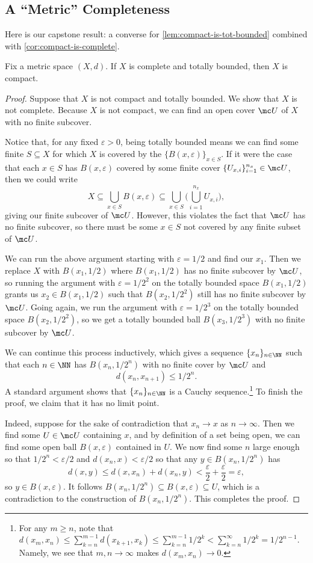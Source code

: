 \documentclass[../notes.tex]{subfiles}
\begin{document}
\subsection{A ``Metric'' Completeness}
Here is our capstone result: a converse for \autoref{lem:compact-is-tot-bounded} combined with \autoref{cor:compact-is-complete}.
\begin{theorem} \label{thm:metric-compact}
	Fix a metric space $(X,d)$. If $X$ is complete and totally bounded, then $X$ is compact.
\end{theorem}
\begin{proof}
	Suppose that $X$ is not compact and totally bounded. We show that $X$ is not complete. Because $X$ is not compact, we can find an open cover $\mc U$ of $X$ with no finite subcover.
	
	Notice that, for any fixed $\varepsilon>0$, being totally bounded means we can find some finite $S\subseteq X$ for which $X$ is covered by the $\{B(x,\varepsilon)\}_{x\in S}$. If it were the case that each $x\in S$ has $B(x,\varepsilon)$ covered by some finite cover $\{U_{x,i}\}_{i=1}^{n_x}\in\mc U$, then we could write
	\[X\subseteq\bigcup_{x\in S}B(x,\varepsilon)\subseteq\bigcup_{x\in S}\Bigg(\bigcup_{i=1}^{n_x}U_{x,i}\Bigg),\]
	giving our finite subcover of $\mc U$. However, this violates the fact that $\mc U$ has no finite subcover, so there must be some $x\in S$ not covered by any finite subset of $\mc U$.

	We can run the above argument starting with $\varepsilon=1/2$ and find our $x_1$. Then we replace $X$ with $B(x_1,1/2)$ where $B(x_1,1/2)$ has no finite subcover by $\mc U$, so running the argument with $\varepsilon=1/2^2$ on the totally bounded space $B(x_1,1/2)$ grants us $x_2\in B(x_1,1/2)$ such that $B(x_2,1/2^2)$ still has no finite subcover by $\mc U$. Going again, we run the argument with $\varepsilon=1/2^3$ on the totally bounded space $B(x_2,1/2^2)$, so we get a totally bounded ball $B(x_3,1/2^3)$ with no finite subcover by $\mc U$.
	
	We can continue this process inductively, which gives a sequence $\{x_n\}_{n\in\NN}$ such that each $n\in\NN$ has $B(x_n,1/2^n)$ with no finite cover by $\mc U$ and
	\[d(x_n,x_{n+1})\le 1/2^n.\]
	A standard argument shows that $\{x_n\}_{n\in\NN}$ is a Cauchy sequence.\footnote{For any $m\ge n$, note that $d(x_m,x_n)\le\sum_{k=n}^{m-1}d(x_{k+1},x_k)\le\sum_{k=n}^{m-1}1/2^k<\sum_{k=n}^\infty1/2^k=1/2^{n-1}$. Namely, we see that $m,n\to\infty$ makes $d(x_m,x_n)\to0$.} To finish the proof, we claim that it has no limit point.

	Indeed, suppose for the sake of contradiction that $x_n\to x$ as $n\to\infty$. Then we find some $U\in\mc U$ containing $x$, and by definition of a set being open, we can find some open ball $B(x,\varepsilon)$ contained in $U$. We now find some $n$ large enough so that $1/2^n<\varepsilon/2$ and $d(x_n,x)<\varepsilon/2$ so that any $y\in B(x_n,1/2^n)$ has
	\[d(x,y)\le d(x,x_n)+d(x_n,y)<\frac\varepsilon2+\frac\varepsilon2=\varepsilon,\]
	so $y\in B(x,\varepsilon)$. It follows $B(x_n,1/2^n)\subseteq B(x,\varepsilon)\subseteq U$, which is a contradiction to the construction of $B(x_n,1/2^n)$. This completes the proof.
\end{proof}
\end{document}
